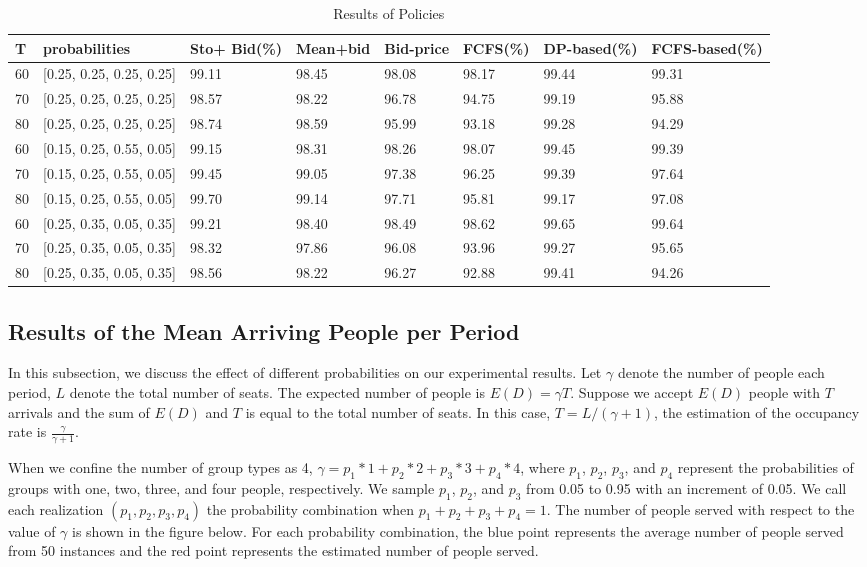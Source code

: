 \begin{table}[ht]
  \centering
  \caption{Results of Policies}
  \begin{tabular}{|l|l|l|l|l|l|l|l|}
  \hline
   T & probabilities &  Sto+ Bid(\%) & Mean+bid & Bid-price & FCFS(\%) & DP-based(\%) & FCFS-based(\%) \\
  \hline
   60  & [0.25, 0.25, 0.25, 0.25]  & 99.11 & 98.45 & 98.08 & 98.17 & 99.44 & 99.31 \\
   70  & [0.25, 0.25, 0.25, 0.25]  & 98.57 & 98.22 & 96.78 & 94.75 & 99.19 & 95.88 \\
   80  & [0.25, 0.25, 0.25, 0.25]  & 98.74 & 98.59 & 95.99 & 93.18 & 99.28 & 94.29 \\
   \hline
   60  & [0.15, 0.25, 0.55, 0.05]  & 99.15 & 98.31 & 98.26 & 98.07 & 99.45 & 99.39 \\
   70  & [0.15, 0.25, 0.55, 0.05]  & 99.45 & 99.05 & 97.38 & 96.25 & 99.39 & 97.64 \\
   80  & [0.15, 0.25, 0.55, 0.05]  & 99.70 & 99.14 & 97.71 & 95.81 & 99.17 & 97.08 \\
   \hline
   60  & [0.25, 0.35, 0.05, 0.35]  & 99.21 & 98.40 & 98.49 & 98.62 & 99.65 & 99.64 \\
   70  & [0.25, 0.35, 0.05, 0.35]  & 98.32 & 97.86 & 96.08 & 93.96 & 99.27 & 95.65 \\
   80  & [0.25, 0.35, 0.05, 0.35]  & 98.56 & 98.22 & 96.27 & 92.88 & 99.41 & 94.26 \\
  \hline
  \end{tabular}
\end{table}


\subsection{Results of the Mean Arriving People per Period}
In this subsection, we discuss the effect of different probabilities on our experimental results. Let $\gamma$ denote the number of people each period, $L$ denote the total number of seats. The expected number of people is $E(D) = \gamma T$. Suppose we accept $E(D)$ people with $T$ arrivals and the sum of $E(D)$ and $T$ is equal to the total number of seats. In this case, $T = L/(\gamma + 1)$, the estimation of the occupancy rate is $\frac{\gamma}{\gamma+1}$. 

When we confine the number of group types as 4, $\gamma = p_1 * 1 + p_2 * 2 + p_3 * 3 + p_4 * 4$, where $p_1$, $p_2$, $p_3$, and $p_4$ represent the probabilities of groups with one, two, three, and four people, respectively.
We sample $p_1$, $p_2$, and $p_3$ from 0.05 to 0.95 with an increment of 0.05. We call each realization $(p_1, p_2, p_3, p_4)$ the probability combination when $p_1 + p_2 + p_3 + p_4 = 1$. The number of people served with respect to the value of $\gamma$ is shown in the figure below. For each probability combination, the blue point represents the average number of people served from 50 instances and the red point represents the estimated number of people served.


